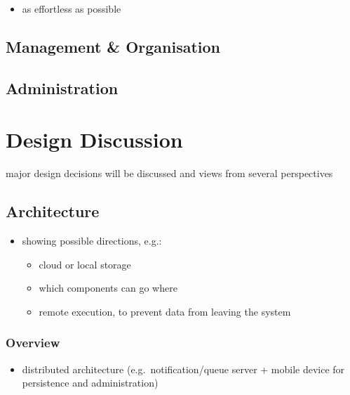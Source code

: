 \documentclass[12pt,english,a4paper,titlepage,cleardoublepage=empty,dottedtoc]{report}
\providecommand{\tightlist}{%
  \setlength{\itemsep}{0pt}\setlength{\parskip}{0pt}}
\begin{document}
\begin{itemize}
\tightlist
\item
  as effortless as possible
\end{itemize}

\section{Management \& Organisation}\label{management-organisation}

\section{Administration}\label{administration}

\chapter{Design Discussion}\label{design-discussion}

major design decisions will be discussed and views from several
perspectives

\section{Architecture}\label{architecture}

\begin{itemize}
\tightlist
\item
  showing possible directions, e.g.:

  \begin{itemize}
  \tightlist
  \item
    cloud or local storage
  \item
    which components can go where
  \item
    remote execution, to prevent data from leaving the system
  \end{itemize}
\end{itemize}

\subsection{Overview}\label{overview}

\begin{itemize}
\tightlist
\item
  distributed architecture (e.g.~notification/queue server + mobile
  device for persistence and administration)
\end{itemize}
\end{document}
